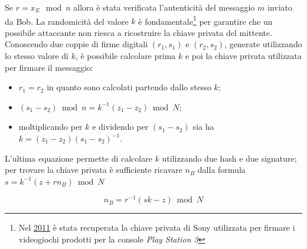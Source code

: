 Se $r=x_E \mod n$ allora è stata verificata l'autenticità del messaggio $m$ inviato da Bob.\newline\newline
La randomicità del valore $k$ è fondamentale\footnote{Nel \href{https://www.bbc.com/news/technology-12116051}{2011} è stata recuperata la chiave privata di Sony utilizzata per firmare i videogiochi prodotti per la console \textit{Play Station 3}} per garantire che un possibile attaccante non riesca a ricostruire la chiave privata del mittente. Conoscendo due coppie di firme digitali $(r_1,s_1)$ e $(r_2, s_2)$, generate utilizzando lo stesso valore di $k$, è possibile calcolare prima $k$ e poi la chiave privata utilizzata per firmare il messaggio:

\begin{itemize}
    \item $r_1=r_2$ in quanto sono calcolati partendo dallo stesso $k$;
    \item $(s_1-s_2)\bmod n=k^{-1}(z_1-z_2) \bmod N$;
    \item moltiplicando per $k$ e dividendo per $(s_1-s_2)$ sia ha $k=(z_1-z_2)(s_1-s_2)^{-1}$.
\end{itemize}
L'ultima equazione permette di calcolare $k$ utilizzando due hash e due signature; per trovare la chiave privata è sufficiente ricavare $n_B$ dalla formula $s=k^{-1}(z+rn_B)\bmod N$

\begin{equation}
    n_B = r^{-1} (sk-z)\bmod N
\end{equation}

